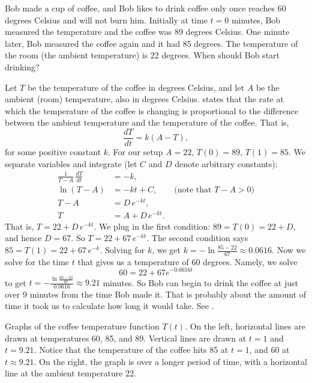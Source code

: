 \begin{example} \label{sep:coffeeexample}
Bob made a cup of coffee, and
Bob likes to drink coffee only once reaches 60 degrees Celsius and will not burn him.
Initially at time $t=0$ minutes,
Bob measured the temperature and the coffee was 89 degrees Celsius.
One minute later, Bob measured the coffee again and it had 85 degrees.
The temperature of the room (the ambient temperature) is 22 degrees.
When should Bob start drinking?

Let $T$ be the temperature of the coffee in degrees Celsius, and let $A$ be
the ambient (room) temperature, also in degrees Celsius.
 states that the rate at which the
temperature of the coffee is changing
is proportional to the difference between the
ambient temperature and the temperature of the coffee.  That is,
\begin{equation*}
\frac{dT}{dt} = k(A-T) ,
\end{equation*}
for some positive constant $k$.
For our setup $A=22$, $T(0) = 89$, $T(1) = 85$.
We separate variables and integrate (let $C$ and $D$ denote arbitrary
constants):
\begin{align*}
\frac{1}{T-A} \, \frac{dT}{dt} & = -k , \\
\ln (T-A) &= -kt + C , \qquad \text{(note that } T-A > 0 \text{)} \\
T-A &= D\, e^{-kt} ,  \\
T &= A + D\, e^{-kt} .
\end{align*}
That is,
$T = 22 + D\, e^{-kt}$.  We plug in the first condition: $89 = T(0) = 22 +
D$,
and hence $D = 67$.  So
$T = 22 + 67\, e^{-kt}$.  The second condition says $85 = T(1) = 
22 + 67\, e^{-k}$.  Solving for $k$, we get
$k = - \ln \frac{85-22}{67} \approx 0.0616$.  Now we solve for the time $t$
that gives us a temperature of 60 degrees.  Namely, we solve
\begin{equation*}
60 = 22 + 67 e^{-0.0616t}
\end{equation*}
to get
$t = - \frac{\ln \frac{60-22}{67}}{0.0616} \approx 9.21$ minutes.  So Bob can
begin to drink the coffee at just over 9 minutes from the time Bob made
it.  That is probably about the amount of time it took us to calculate how long
it would take.  See .
\begin{myfig}
\capstart
\caption{Graphs of the coffee temperature function $T(t)$.
On the left, horizontal
lines are drawn at temperatures 60, 85, and 89.  Vertical lines
are drawn at $t=1$ and $t=9.21$.  Notice that the
temperature of the coffee hits 85 at $t=1$, and 60 at
$t \approx 9.21$.  On the right, the graph is over a longer period of time,
with a horizontal line at the ambient temperature 22.\label{sintro:coffeefig}}
\end{myfig}
\end{example}

